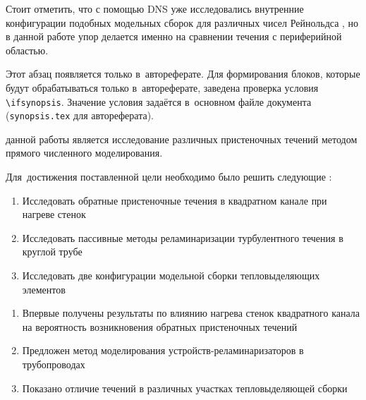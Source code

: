 Стоит отметить, что с помощью DNS уже исследовались внутренние конфигурации 
подобных модельных сборок для различных чисел Рейнольдса \cite{shams2018towards}, 
но в данной работе упор делается именно на сравнении течения с периферийной областью.
%






\ifsynopsis
Этот абзац появляется только в~автореферате.
Для формирования блоков, которые будут обрабатываться только в~автореферате,
заведена проверка условия \verb!\!\verb!ifsynopsis!.
Значение условия задаётся в~основном файле документа (\verb!synopsis.tex! для
автореферата).
\else
\fi


{\aim} данной работы является исследование различных пристеночных течений 
методом прямого численного моделирования.

Для~достижения поставленной цели необходимо было решить следующие {\tasks}:
\begin{enumerate}[beginpenalty=10000] %
  \item Исследовать обратные пристеночные течения в квадратном канале при нагреве стенок 
  \item Исследовать пассивные методы реламинаризации турбулентного течения в круглой трубе
  \item Исследовать две конфигурации модельной сборки тепловыделяющих элементов
\end{enumerate}


{\novelty}
\begin{enumerate}[beginpenalty=10000] %
  \item Впервые получены результаты по влиянию нагрева стенок квадратного канала на вероятность 
  возникновения обратных пристеночных течений
  \item Предложен метод моделирования устройств-реламинаризаторов в трубопроводах
  \item Показано отличие течений в различных участках тепловыделяющей сборки
\end{enumerate}

